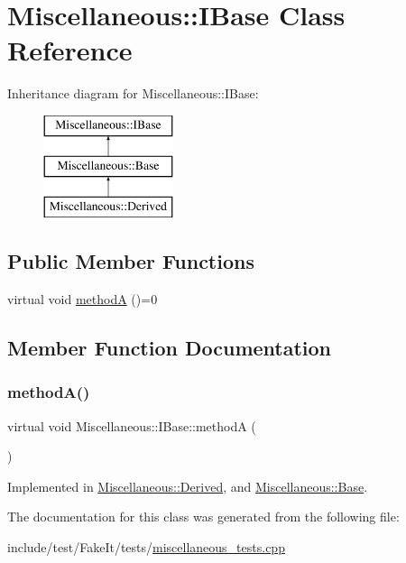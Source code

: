 \hypertarget{classMiscellaneous_1_1IBase}{}\section{Miscellaneous\+::I\+Base Class Reference}
\label{classMiscellaneous_1_1IBase}
Inheritance diagram for Miscellaneous\+::I\+Base\+:\begin{figure}[H]
\begin{center}
\leavevmode
\includegraphics[height=3.000000cm]{classMiscellaneous_1_1IBase}
\end{center}
\end{figure}
\subsection*{Public Member Functions}
\begin{DoxyCompactItemize}
\item 
virtual void \mbox{\hyperlink{classMiscellaneous_1_1IBase_aacf5193ff90d226c8d553f5c9a18e4d3}{methodA}} ()=0
\end{DoxyCompactItemize}


\subsection{Member Function Documentation}
\mbox{\label{classMiscellaneous_1_1IBase_aacf5193ff90d226c8d553f5c9a18e4d3}} 
\subsubsection{\texorpdfstring{methodA()}{methodA()}}
{\footnotesize\ttfamily virtual void Miscellaneous\+::\+I\+Base\+::methodA (\begin{DoxyParamCaption}{ }\end{DoxyParamCaption})\hspace{0.3cm}{\ttfamily [pure virtual]}}



Implemented in \mbox{\hyperlink{classMiscellaneous_1_1Derived_a580f237659791e97b60e1cd57aadc361}{Miscellaneous\+::\+Derived}}, and \mbox{\hyperlink{classMiscellaneous_1_1Base_a232b441e93771353e2a61dd083066e69}{Miscellaneous\+::\+Base}}.



The documentation for this class was generated from the following file\+:\begin{DoxyCompactItemize}
\item 
include/test/\+Fake\+It/tests/\mbox{\hyperlink{miscellaneous__tests_8cpp}{miscellaneous\+\_\+tests.\+cpp}}\end{DoxyCompactItemize}
